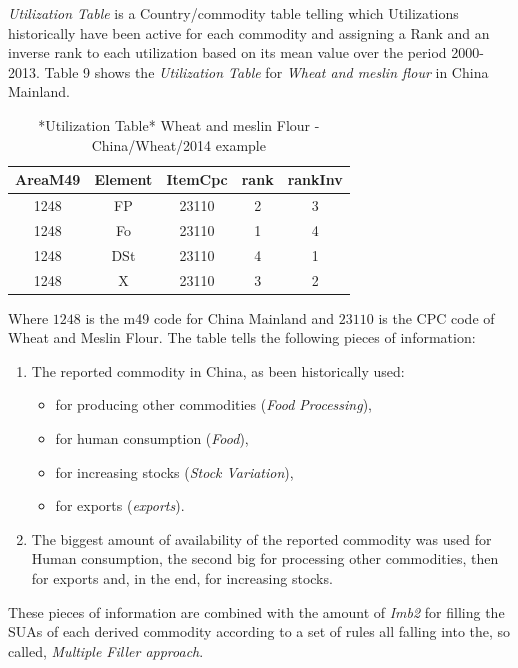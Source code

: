 \documentclass[]{article}
\providecommand{\tightlist}{%
  \setlength{\itemsep}{0pt}\setlength{\parskip}{0pt}}
\begin{document}
\emph{Utilization Table} is a Country/commodity table telling which
Utilizations historically have been active for each commodity and
assigning a Rank and an inverse rank to each utilization based on its
mean value over the period 2000-2013. Table 9 shows the
\emph{Utilization Table} for \emph{Wheat and meslin flour} in China
Mainland.

\begin{table}

\caption{\label{tab:t8}*Utilization Table* Wheat and meslin Flour - China/Wheat/2014 example}
\centering
\begin{tabular}[t]{c|c|c|c|c}
\hline
AreaM49 & Element & ItemCpc & rank & rankInv\\
\hline
1248 & FP & 23110 & 2 & 3\\
\hline
1248 & Fo & 23110 & 1 & 4\\
\hline
1248 & DSt & 23110 & 4 & 1\\
\hline
1248 & X & 23110 & 3 & 2\\
\hline
\end{tabular}
\end{table}

Where \(1248\) is the m49 code for China Mainland and \(23110\) is the
CPC code of Wheat and Meslin Flour. The table tells the following pieces
of information:

\begin{enumerate}
\def\labelenumi{\arabic{enumi}.}
\tightlist
\item
  The reported commodity in China, as been historically used:

  \begin{itemize}
  \tightlist
  \item
    for producing other commodities (\emph{Food Processing}),
  \item
    for human consumption (\emph{Food}),
  \item
    for increasing stocks (\emph{Stock Variation}),
  \item
    for exports (\emph{exports}).
  \end{itemize}
\item
  The biggest amount of availability of the reported commodity was used
  for Human consumption, the second big for processing other
  commodities, then for exports and, in the end, for increasing stocks.
\end{enumerate}

These pieces of information are combined with the amount of \emph{Imb2}
for filling the SUAs of each derived commodity according to a set of
rules all falling into the, so called, \emph{Multiple Filler approach}.
\end{document}
